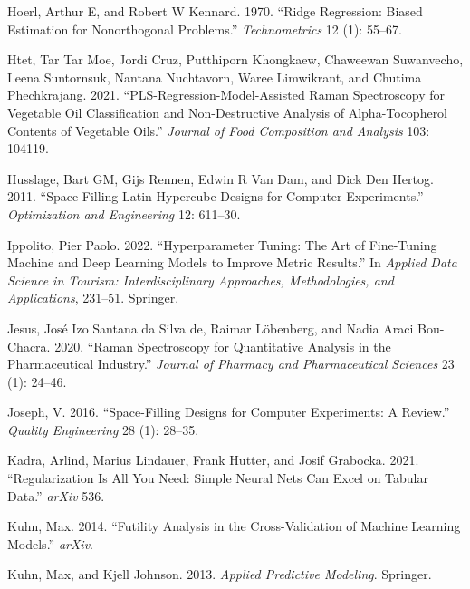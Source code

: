 \documentclass[
  letterpaper,
  DIV=11,
  numbers=noendperiod]{scrartcl}
\newlength{\cslhangindent}
\newlength{\cslentryspacingunit} %
\newenvironment{CSLReferences}[2] %
 {%
  \setlength{\parindent}{0pt}
  \ifodd #1
  \let\oldpar\par
  \def\par{\hangindent=\cslhangindent\oldpar}
  \fi
  \setlength{\parskip}{#2\cslentryspacingunit}
 }%
 {}
\begin{document}
\begin{CSLReferences}{1}{0}
\leavevmode{}%
Hoerl, Arthur E, and Robert W Kennard. 1970. {``Ridge Regression: Biased
Estimation for Nonorthogonal Problems.''} \emph{Technometrics} 12 (1):
55--67.

\leavevmode{}%
Htet, Tar Tar Moe, Jordi Cruz, Putthiporn Khongkaew, Chaweewan
Suwanvecho, Leena Suntornsuk, Nantana Nuchtavorn, Waree Limwikrant, and
Chutima Phechkrajang. 2021. {``PLS-Regression-Model-Assisted Raman
Spectroscopy for Vegetable Oil Classification and Non-Destructive
Analysis of Alpha-Tocopherol Contents of Vegetable Oils.''}
\emph{Journal of Food Composition and Analysis} 103: 104119.

\leavevmode{}%
Husslage, Bart GM, Gijs Rennen, Edwin R Van Dam, and Dick Den Hertog.
2011. {``Space-Filling Latin Hypercube Designs for Computer
Experiments.''} \emph{Optimization and Engineering} 12: 611--30.

\leavevmode{}%
Ippolito, Pier Paolo. 2022. {``Hyperparameter Tuning: The Art of
Fine-Tuning Machine and Deep Learning Models to Improve Metric
Results.''} In \emph{Applied Data Science in Tourism: Interdisciplinary
Approaches, Methodologies, and Applications}, 231--51. Springer.

\leavevmode{}%
Jesus, José Izo Santana da Silva de, Raimar Löbenberg, and Nadia Araci
Bou-Chacra. 2020. {``Raman Spectroscopy for Quantitative Analysis in the
Pharmaceutical Industry.''} \emph{Journal of Pharmacy and Pharmaceutical
Sciences} 23 (1): 24--46.

\leavevmode{}%
Joseph, V. 2016. {``Space-Filling Designs for Computer Experiments: {A}
Review.''} \emph{Quality Engineering} 28 (1): 28--35.

\leavevmode{}%
Kadra, Arlind, Marius Lindauer, Frank Hutter, and Josif Grabocka. 2021.
{``Regularization Is All You Need: Simple Neural Nets Can Excel on
Tabular Data.''} \emph{arXiv} 536.

\leavevmode{}%
Kuhn, Max. 2014. {``Futility Analysis in the Cross-Validation of Machine
Learning Models.''} \emph{arXiv}.

\leavevmode{}%
Kuhn, Max, and Kjell Johnson. 2013. \emph{Applied Predictive Modeling}.
Springer.


\end{CSLReferences}
\end{document}
